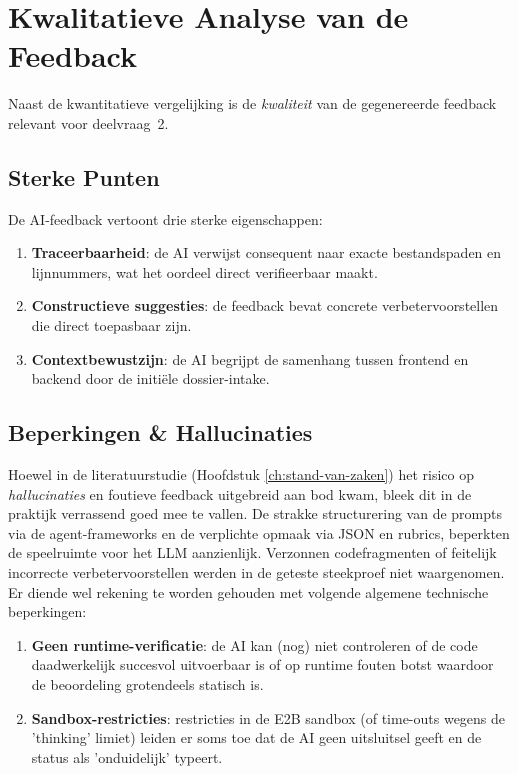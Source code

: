 \section{Kwalitatieve Analyse van de Feedback}
\label{sec:kwalitatief}

Naast de kwantitatieve vergelijking is de \textit{kwaliteit} van de gegenereerde feedback relevant voor deelvraag~2.

\subsection{Sterke Punten}

De AI-feedback vertoont drie sterke eigenschappen:
\begin{enumerate}
    \item \textbf{Traceerbaarheid}: de AI verwijst consequent naar exacte bestandspaden en lijnnummers, wat het oordeel direct verifieerbaar maakt.
    \item \textbf{Constructieve suggesties}: de feedback bevat concrete verbetervoorstellen die direct toepasbaar zijn.
    \item \textbf{Contextbewustzijn}: de AI begrijpt de samenhang tussen frontend en backend door de initiële dossier-intake.
\end{enumerate}

\subsection{Beperkingen \& Hallucinaties}

Hoewel in de literatuurstudie (Hoofdstuk \ref{ch:stand-van-zaken}) het risico op \textit{hallucinaties} en foutieve feedback uitgebreid aan bod kwam, bleek dit in de praktijk verrassend goed mee te vallen. De strakke structurering van de prompts via de agent-frameworks en de verplichte opmaak via JSON en rubrics, beperkten de speelruimte voor het LLM aanzienlijk. Verzonnen codefragmenten of feitelijk incorrecte verbetervoorstellen werden in de geteste steekproef niet waargenomen. Er diende wel rekening te worden gehouden met volgende algemene technische beperkingen:

\begin{enumerate}
    \item \textbf{Geen runtime-verificatie}: de AI kan (nog) niet controleren of de code daadwerkelijk succesvol uitvoerbaar is of op runtime fouten botst waardoor de beoordeling grotendeels statisch is.
    \item \textbf{Sandbox-restricties}: restricties in de E2B sandbox (of time-outs wegens de 'thinking' limiet) leiden er soms toe dat de AI geen uitsluitsel geeft en de status als 'onduidelijk' typeert.
\end{enumerate}


